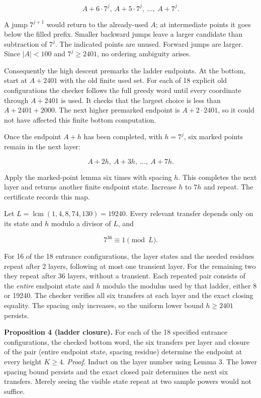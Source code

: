 \documentclass[11pt,a4paper]{article}
\begin{document}
\begin{equation*}
A+6\cdot7^j,\ A+5\cdot7^j,\ \ldots,\ A+7^j.
\end{equation*}

A jump $7^{j+1}$ would return to the already-used $A$; at intermediate points it goes below the filled prefix. Smaller backward jumps leave a larger candidate than subtraction of $7^j$. The indicated points are unused. Forward jumps are larger. Since $|A|<100$ and $7^j\ge2401$, no ordering ambiguity arises.

Consequently the high descent premarks the ladder endpoints. At the bottom, start at $A+2401$ with the old finite used set. For each of 18 explicit old configurations the checker follows the full greedy word until every coordinate through $A+2401$ is used. It checks that the largest choice is less than $A+2401+2000$. The next higher premarked endpoint is $A+2\cdot2401$, so it could not have affected this finite bottom computation.

Once the endpoint $A+h$ has been completed, with $h=7^j$, six marked points remain in the next layer:

\begin{equation*}
A+2h,\ A+3h,\ \ldots,\ A+7h.
\end{equation*}

Apply the marked-point lemma six times with spacing $h$. This completes the next layer and returns another finite endpoint state. Increase $h$ to $7h$ and repeat. The certificate records this map.

Let $L=\operatorname{lcm}(1,4,8,74,130)=19240$. Every relevant transfer depends only on its state and $h$ modulo a divisor of $L$, and

\begin{equation*}
7^{36}\equiv1\pmod L. \tag{3}\label{eq:period}
\end{equation*}

For 16 of the 18 entrance configurations, the layer states and the needed residues repeat after 2 layers, following at most one transient layer. For the remaining two they repeat after 36 layers, without a transient. Each repeated pair consists of the \emph{entire} endpoint state and $h$ modulo the modulus used by that ladder, either 8 or 19240. The checker verifies all six transfers at each layer and the exact closing equality. The spacing only increases, so the uniform lower bound $h\ge2401$ persists.

\noindent\textbf{Proposition 4 (ladder closure).} For each of the 18
specified entrance configurations, the checked bottom word, the six
transfers per layer and closure of the pair (entire endpoint state,
spacing residue) determine the endpoint at every height $K\ge4$.
\emph{Proof.} Induct on the layer number using Lemma 3. The lower spacing
bound persists and the exact closed pair determines the next six
transfers. Merely seeing the visible state repeat at two sample powers
would not suffice.
\end{document}
